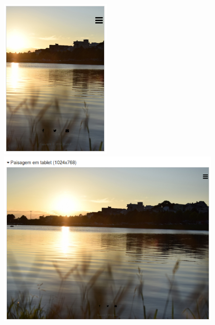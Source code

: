 \begin{figure}[!htb]
\setcounter{figure}{0}
\centering
\begin{minipage}{.5\textwidth}
  \centering
  \includegraphics[width=.3\linewidth]{./img/1.png}
\end{minipage}%
\begin{minipage}{.5\textwidth}
  \centering
  \includegraphics[width=.8\linewidth]{./img/6.png}
\end{minipage}
\end{figure}